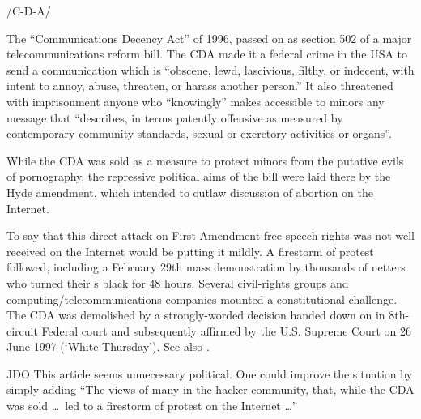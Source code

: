  /C-D-A/

The ``Communications Decency Act'' of 1996, passed on 
as section 502 of a major telecommunications reform bill. The CDA made it a
federal crime in the USA to send a communication which is ``obscene, lewd,
lascivious, filthy, or indecent, with intent to annoy, abuse, threaten, or
harass another person.'' It also threatened with imprisonment anyone who
``knowingly'' makes accessible to minors any message that ``describes, in terms
patently offensive as measured by contemporary community standards, sexual or
excretory activities or organs''.

While the CDA was sold as a measure to protect minors from the putative evils of
pornography, the repressive political aims of the bill were laid there by the
Hyde amendment, which intended to outlaw discussion of abortion on the Internet.

To say that this direct attack on First Amendment free-speech rights was not
well received on the Internet would be putting it mildly. A firestorm of protest
followed, including a February 29th mass demonstration by thousands of netters
who turned their s black for 48 hours. Several civil-rights
groups and computing/telecommunications companies mounted a constitutional
challenge. The CDA was demolished by a strongly-worded decision handed down on
in 8th-circuit Federal court and subsequently affirmed by the U.S. Supreme Court
on 26 June 1997 (`White Thursday'). See also .

\begin{editor}{JDO}
    This article seems unnecessary political. One could improve the situation by
    simply adding ``The views of many in the hacker community, that, while the
    CDA was sold \dots\ led to a firestorm of protest on the Internet \dots''
\end{editor}

